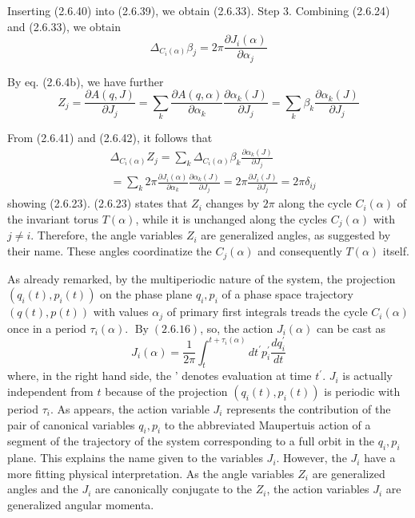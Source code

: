 \documentclass{article}
\begin{document}
Inserting (2.6.40) into (2.6.39), we obtain (2.6.33).
Step 3. Combining (2.6.24) and (2.6.33), we obtain
$$
\begin{equation*}
\Delta_{C_{i}(\alpha)} \beta_{j}=2 \pi \frac{\partial J_{i}(\alpha)}{\partial \alpha_{j}} \tag{2.6.41}
\end{equation*}
$$

By eq. (2.6.4b), we have further
$$
\begin{equation*}
Z_{j}=\frac{\partial A(q, J)}{\partial J_{j}}=\sum_{k} \frac{\partial A(q, \alpha)}{\partial \alpha_{k}} \frac{\partial \alpha_{k}(J)}{\partial J_{j}}=\sum_{k} \beta_{k} \frac{\partial \alpha_{k}(J)}{\partial J_{j}} \tag{2.6.42}
\end{equation*}
$$

From (2.6.41) and (2.6.42), it follows that
$$
\begin{align*}
& \Delta_{C_{i}(\alpha)} Z_{j}=\sum_{k} \Delta_{C_{i}(\alpha)} \beta_{k} \frac{\partial \alpha_{k}(J)}{\partial J_{j}}  \tag{2.6.43}\\
&=\sum_{k} 2 \pi \frac{\partial J_{i}(\alpha)}{\partial \alpha_{k}} \frac{\partial \alpha_{k}(J)}{\partial J_{j}}=2 \pi \frac{\partial J_{i}(J)}{\partial J_{j}}=2 \pi \delta_{i j}
\end{align*}
$$
showing (2.6.23).
(2.6.23) states that $Z_{i}$ changes by $2 \pi$ along the cycle $C_{i}(\alpha)$ of the invariant torus $T(\alpha)$, while it is unchanged along the cycles $C_{j}(\alpha)$ with $j \neq i$. Therefore, the
angle variables $Z_{i}$ are generalized angles, as suggested by their name. These angles coordinatize the $C_{j}(\alpha)$ and consequently $T(\alpha)$ itself.

As already remarked, by the multiperiodic nature of the system, the projection $\left(q_{i}(t), p_{i}(t)\right)$ on the phase plane $q_{i}, p_{i}$ of a phase space trajectory $(q(t), p(t))$ with values $\alpha_{j}$ of primary first integrals treads the cycle $C_{i}(\alpha)$ once in a period $\tau_{i}(\alpha)$. $\operatorname{By}(2.6 .16)$, so, the action $J_{i}(\alpha)$ can be cast as
$$
\begin{equation*}
J_{i}(\alpha)=\frac{1}{2 \pi} \int_{t}^{t+\tau_{i}(\alpha)} d t^{\prime} p_{i}^{\prime} \frac{d q_{i}^{\prime}}{d t} \tag{2.6.44}
\end{equation*}
$$
where, in the right hand side, the ' denotes evaluation at time $t^{\prime}$. $J_{i}$ is actually independent from $t$ because of the projection $\left(q_{i}(t), p_{i}(t)\right)$ is periodic with period $\tau_{i}$. As appears, the action variable $J_{i}$ represents the contribution of the pair of canonical variables $q_{i}, p_{i}$ to the abbreviated Maupertuis action of a segment of the trajectory of the system corresponding to a full orbit in the $q_{i}, p_{i}$ plane. This explains the name given to the variables $J_{i}$. However, the $J_{i}$ have a more fitting physical interpretation. As the angle variables $Z_{i}$ are generalized angles and the $J_{i}$ are canonically conjugate to the $Z_{i}$, the action variables $J_{i}$ are generalized angular momenta.
\end{document}
